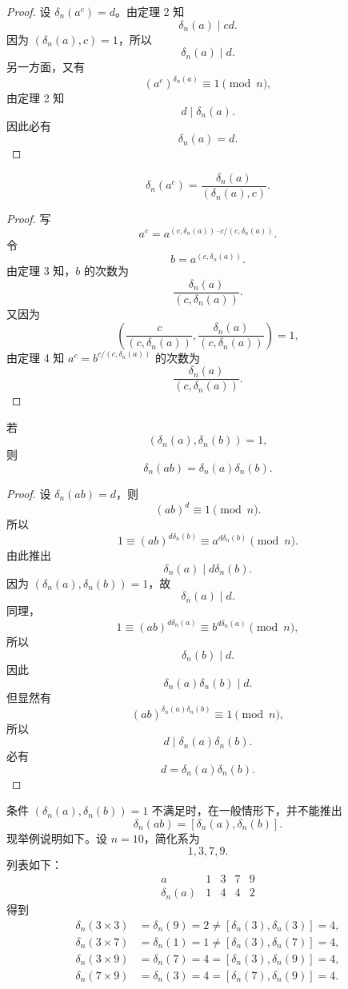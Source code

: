 \begin{proof}
	设 $\delta_n(a^c)=d$。由定理 2 知
	\[
		\delta_n(a)\mid cd.
	\]
	因为 $(\delta_n(a),c)=1$，所以
	\[
		\delta_n(a)\mid d.
	\]
	另一方面，又有
	\[
		(a^c)^{\delta_n(a)}\equiv 1\pmod n,
	\]
	由定理 2 知
	\[
		d\mid \delta_n(a).
	\]
	因此必有
	\[
		\delta_n(a)=d.
	\]
\end{proof}

\begin{theorem}[原文 定理 5]
	\[
		\delta_n(a^c)=\frac{\delta_n(a)}{(\delta_n(a),c)}.
	\]
\end{theorem}

\begin{proof}
	写
	\[
		a^c=a^{(c,\delta_n(a))\cdot c/(c,\delta_n(a))}.
	\]
	令
	\[
		b=a^{(c,\delta_n(a))}.
	\]
	由定理 3 知，$b$ 的次数为
	\[
		\frac{\delta_n(a)}{(c,\delta_n(a))}.
	\]
	又因为
	\[
		\left(\frac{c}{(c,\delta_n(a))},
		\frac{\delta_n(a)}{(c,\delta_n(a))}\right)=1,
	\]
	由定理 4 知 $a^c=b^{c/(c,\delta_n(a))}$ 的次数为
	\[
		\frac{\delta_n(a)}{(c,\delta_n(a))}.
	\]
\end{proof}

\begin{theorem}[原文 定理 6]
	若
	\[
		(\delta_n(a),\delta_n(b))=1,
	\]
	则
	\[
		\delta_n(ab)=\delta_n(a)\delta_n(b).
	\]
\end{theorem}

\begin{proof}
	设 $\delta_n(ab)=d$，则
	\[
		(ab)^d\equiv 1\pmod n.
	\]
	所以
	\[
		1\equiv (ab)^{d\delta_n(b)}\equiv a^{d\delta_n(b)}\pmod n.
	\]
	由此推出
	\[
		\delta_n(a)\mid d\delta_n(b).
	\]
	因为 $(\delta_n(a),\delta_n(b))=1$，故
	\[
		\delta_n(a)\mid d.
	\]
	同理，
	\[
		1\equiv (ab)^{d\delta_n(a)}\equiv b^{d\delta_n(a)}\pmod n,
	\]
	所以
	\[
		\delta_n(b)\mid d.
	\]
	因此
	\[
		\delta_n(a)\delta_n(b)\mid d.
	\]
	但显然有
	\[
		(ab)^{\delta_n(a)\delta_n(b)}\equiv 1\pmod n,
	\]
	所以
	\[
		d\mid \delta_n(a)\delta_n(b).
	\]
	必有
	\[
		d=\delta_n(a)\delta_n(b).
	\]
\end{proof}

条件 $(\delta_n(a),\delta_n(b))=1$ 不满足时，在一般情形下，并不能推出
\[
	\delta_n(ab)=[\delta_n(a),\delta_n(b)].
\]
现举例说明如下。设 $n=10$，简化系为
\[
	1,3,7,9.
\]
列表如下：
\[
\begin{array}{c|cccc}
	a & 1 & 3 & 7 & 9\\ \hline
	\delta_n(a) & 1 & 4 & 4 & 2
\end{array}
\]
得到
\[
\begin{aligned}
	\delta_n(3\times 3)
	&=\delta_n(9)=2\neq [\delta_n(3),\delta_n(3)]=4,\\
	\delta_n(3\times 7)
	&=\delta_n(1)=1\neq [\delta_n(3),\delta_n(7)]=4,\\
	\delta_n(3\times 9)
	&=\delta_n(7)=4=[\delta_n(3),\delta_n(9)]=4,\\
	\delta_n(7\times 9)
	&=\delta_n(3)=4=[\delta_n(7),\delta_n(9)]=4.
\end{aligned}
\]

